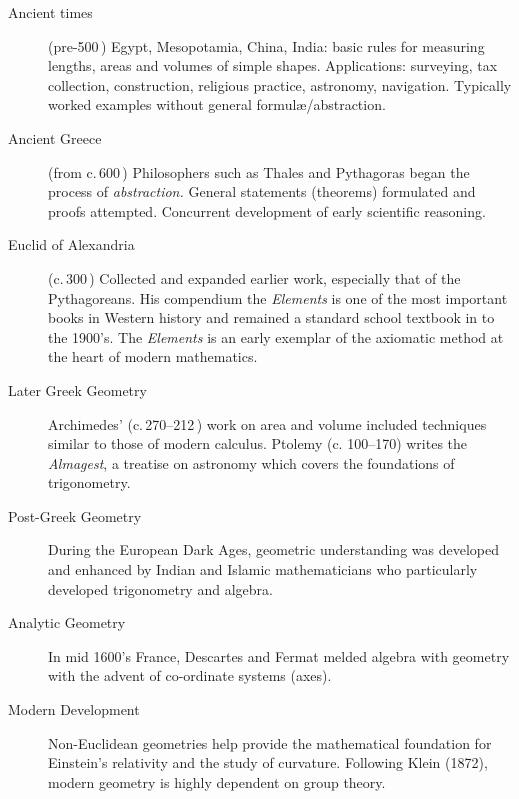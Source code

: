 \begin{description}
	\item[Ancient times] (pre-500\,\BC) Egypt, Mesopotamia, China, India: basic rules for measuring lengths, areas and volumes of simple shapes. Applications: surveying, tax collection, construction, religious practice, astronomy, navigation. Typically worked examples without general formulæ/abstraction.
	
	\item[Ancient Greece] (from c.\,600\,\BC) Philosophers such as Thales and Pythagoras began the process of \emph{abstraction.} General statements (theorems) formulated and proofs attempted. Concurrent development of early scientific reasoning.
	
	\item[Euclid of Alexandria] (c.\,300\,\BC) Collected and expanded earlier work, especially that of the Pytha\-goreans. His compendium the \emph{Elements} is one of the most important books in Western history and remained a standard school textbook in to the 1900's. The \emph{Elements} is an early exemplar of the axiomatic method at the heart of modern mathematics.
	
	\item[Later Greek Geometry] Archimedes' (c.\,270--212\,\BC) work on area and volume included techniques similar to those of modern calculus. %
	Ptolemy (c.\,\AD\,100--170) writes the \emph{Almagest}, a treatise on astronomy which covers the foundations of trigonometry.
	
	\item[Post-Greek Geometry] During the European Dark Ages, geometric understanding was developed and enhanced by Indian and Islamic mathematicians who particularly developed trigonometry and algebra.
	
	\item[Analytic Geometry] In mid 1600's France, Descartes and Fermat melded algebra with geometry with the advent of co-ordinate systems (axes).
 	
	\item[Modern Development] Non-Euclidean geometries help provide the mathematical foundation for Einstein's relativity and the study of curvature. Following Klein (1872), modern geometry is highly dependent on group theory.
\end{description}




